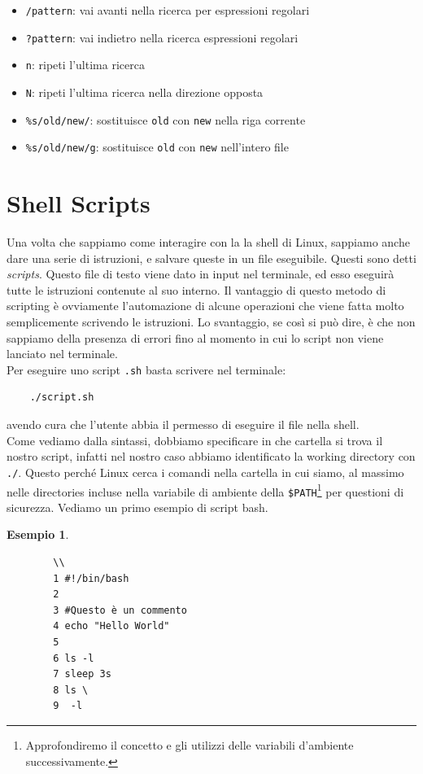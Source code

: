 \documentclass[11pt]{book}
\newtheorem{esempio}[section]{Esempio}
\begin{document}
\begin{itemize}
\begin{itemize}
 			\item \verb*|/pattern|: vai avanti nella ricerca per espressioni regolari
 			\item \verb*|?pattern|: vai indietro nella ricerca espressioni regolari
 			\item \verb*|n|: ripeti l'ultima ricerca
 			\item \verb*|N|: ripeti l'ultima ricerca nella direzione opposta
 			\item \verb*|%s/old/new/|: sostituisce \verb*|old| con \verb*|new| nella riga corrente
 			\item \verb*|%s/old/new/g|: sostituisce \verb*|old| con \verb*|new| nell'intero file		
 		\end{itemize}
 \end{itemize}


\section{Shell Scripts}
Una volta che sappiamo come interagire con la la shell di Linux, sappiamo anche dare una serie di istruzioni, e salvare queste in un file eseguibile. Questi sono detti \textit{scripts}. Questo file di testo viene dato in input nel terminale, ed esso eseguirà tutte le istruzioni contenute al suo interno. Il vantaggio di questo metodo di scripting è ovviamente l'automazione di alcune operazioni che viene fatta molto semplicemente scrivendo le istruzioni. Lo svantaggio, se così si può dire, è che non sappiamo della presenza di errori fino al momento in cui lo script non viene lanciato nel terminale. \\
Per eseguire uno script \verb*|.sh| basta scrivere nel terminale:
\begin{verbatim}
	./script.sh
\end{verbatim}
avendo cura che l'utente abbia il permesso di eseguire il file nella shell.\\
Come vediamo dalla sintassi, dobbiamo specificare in che cartella si trova il nostro script, infatti nel nostro caso abbiamo identificato la working directory con \verb*|./|. Questo perché Linux cerca i comandi nella cartella in cui siamo, al massimo nelle directories incluse nella variabile di ambiente della \verb*|$PATH|\footnote{Approfondiremo il concetto e gli utilizzi delle variabili d'ambiente successivamente.} per questioni di sicurezza. Vediamo un primo esempio di script bash.
\begin{esempio}
	\begin{verbatim}
		\\
		1 #!/bin/bash
		2
		3 #Questo è un commento
		4 echo "Hello World"
		5
		6 ls -l
		7 sleep 3s
		8 ls \
		9  -l
	\end{verbatim}
\end{esempio}
\end{document}
